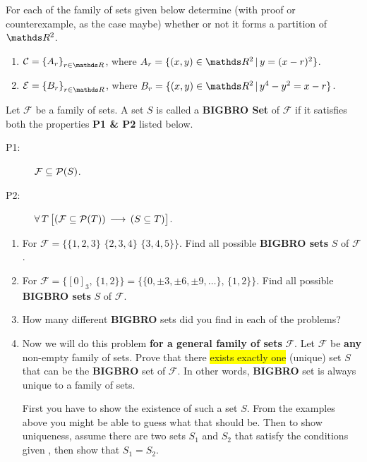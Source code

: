 \documentclass[11pt]{article}
\newcounter{Quesnumb}  %
\newcommand{\problemnum}{%
            \addtocounter{Quesnumb}{1}%
            \arabic{Quesnumb}}
\begin{document}
\begin{problem}{\problemnum}
For each of the family of sets given below determine (with proof or counterexample, as the case maybe) whether or not it forms a partition of $\bbR^2$.
\begin{enumerate}[label=\alph*).]
    \item $\mathcal{C}=\left\{A_{r}\right\}_{r \in \bbR}$, where $A_r=\{(x,y) \in \bbR^2 \, | \, y=(x-r)^2\}$.
    \item $\mathcal{E}=\left\{B_{r}\right\}_{r \in \bbR}$, where $B_r=\{(x,y) \in \bbR^2 \, | \, y^4-y^2=x-r\}$.
\end{enumerate}
\end{problem}
\newpage
\begin{problem}{\problemnum}
Let $\mathcal{F}$ be a family of sets. A set $S$ is called a \textbf{BIGBRO Set} of $\mathcal{F}$ if it satisfies both the properties \textbf{P1 \& P2} listed below.
\begin{description}
    \item[P1:] $\mathcal{F} \subseteq \power[S]$.
    \item[P2:] $\forall \, T \, \big[(\mathcal{F} \subseteq \power[T]) \, \longrightarrow \, (S \subseteq T)\big]$.
\end{description}

\begin{enumerate}[label=\alph*).]
    \item For $\mathcal{F}=\big\{\{1,2,3\}\, \, \{2,3,4\}\, \, \{3,4,5\}\big\}$. Find all possible \textbf{BIGBRO sets} $S$ of $\mathcal{F}$.
    \item For $\mathcal{F}=\big\{[0]_3,\, \{1,2\}\big\}=\big\{\{0, \pm 3, \pm 6, \pm 9, \ldots\},\, \{1,2\}\big\}$. Find all possible \textbf{BIGBRO sets} $S$ of $\mathcal{F}$.
    \item How many different \textbf{BIGBRO} sets did you find in each of the problems?
    \item Now we will do this problem \textbf{for a general family of sets} $\mathcal{F}$. Let $\mathcal{F}$ be \textbf{any} non-empty family of sets. Prove that there \colorbox{yellow}{exists exactly one} (\textsf{unique}) set $S$ that can be the \textbf{BIGBRO} set of $\mathcal{F}$. In other words, \textbf{BIGBRO} set is always unique to a family of sets.
        \begin{tcolorbox}[colback=white,colframe=red!65!black,title={Hint}]
        First you have to show the existence of such a set $S$. From the examples above you might be able to guess what that should be. Then to show uniqueness, assume there are two sets $S_1$ and $S_2$ that satisfy the conditions given , then show that $S_1=S_2$.
        \end{tcolorbox}
\end{enumerate}
\end{problem}
\end{document}
